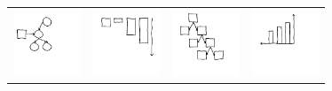 \documentclass{article}
\begin{document}
\newcommand{\exampleImageSize}{2cm}
\begin{figure}[h]
  \begin{minipage}[t]{0.8\linewidth}  
\begin{tabular}{llll}
  \includegraphics[width = \exampleImageSize]{figures/expert-60.png}&
  \includegraphics[width = \exampleImageSize]{figures/expert-5.png}&
    \includegraphics[width = \exampleImageSize]{figures/expert-17.png}&
    \includegraphics[width = \exampleImageSize]{figures/expert-58.png}\\

\end{tabular}
\end{minipage}
\end{figure}
\end{document}
